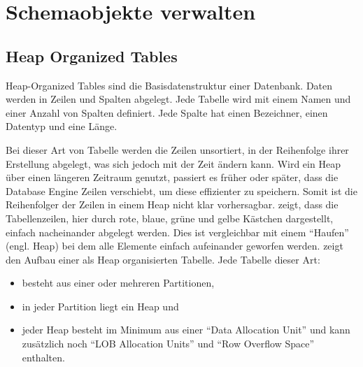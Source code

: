   \chapter{Schemaobjekte verwalten}
    \setcounter{page}{1}
    \minitoc
\newpage

    \section{Heap Organized Tables}
      Heap-Organized Tables sind die Basisdatenstruktur einer Datenbank.
      Daten werden in Zeilen und Spalten abgelegt. Jede Tabelle wird mit einem
      Namen und einer Anzahl von Spalten definiert. Jede Spalte hat einen
      Bezeichner, einen Datentyp und eine L\"ange.

      Bei dieser Art von Tabelle werden die Zeilen unsortiert, in der
      Reihenfolge ihrer Erstellung abgelegt, was sich jedoch mit der Zeit ändern
      kann. Wird ein Heap über einen längeren Zeitraum genutzt, passiert es
      früher oder später, dass die Database Engine Zeilen verschiebt, um diese
      effizienter zu speichern. Somit ist die Reihenfolger der Zeilen in einem
      Heap nicht klar vorhersagbar.
       zeigt, dass die Tabellenzeilen, hier
      durch rote, blaue, gr\"une und gelbe K\"astchen dargestellt, einfach
      nacheinander abgelegt werden. Dies ist vergleichbar mit einem
      \enquote{Haufen} (engl. Heap) bei dem alle Elemente einfach aufeinander
      geworfen werden. 
\clearpage
       zeigt den Aufbau einer als Heap
      organisierten Tabelle. Jede Tabelle dieser Art:
      \begin{itemize}
        \item besteht aus einer oder mehreren Partitionen,
        \item in jeder Partition liegt ein Heap und
        \item jeder Heap besteht im Minimum aus einer \enquote{Data
        Allocation Unit} und kann zusätzlich noch \enquote{LOB Allocation
        Units} und \enquote{Row Overflow Space} enthalten.
      \end{itemize}
